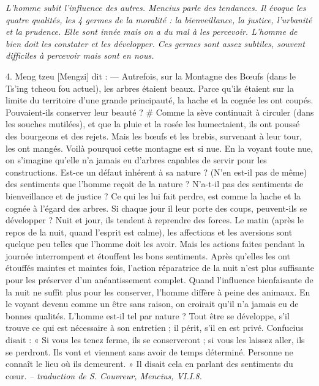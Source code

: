 \textit{L'homme subit l'influence des autres.
Mencius parle des tendances. Il évoque les quatre qualités, les 4 germes de la moralité : la bienveillance, la justice, l'urbanité et la prudence. Elle sont innée mais on a du mal à les percevoir. L'homme de bien doit les constater et les développer. Ces germes sont assez subtiles, souvent difficiles à percevoir mais sont en nous. 
}

\begin{singlequote}
    4.	Meng tzeu [Mengzi] dit :
—	Autrefois, sur la Montagne des Bœufs (dans le Ts’ing tcheou fou actuel), les arbres étaient beaux. Parce qu’ils étaient sur la limite du territoire d’une grande principauté, la hache et la cognée les ont coupés. Pouvaient-ils conserver leur beauté ? # Comme la sève continuait à circuler (dans les souches mutilées), et que la pluie et la rosée les humectaient, ils ont poussé des bourgeons et des rejets. Mais les bœufs et les brebis, survenant à leur tour, les ont mangés. Voilà pourquoi cette montagne est si nue. En la voyant toute nue, on s’imagine qu’elle n’a jamais eu d’arbres capables de servir pour les constructions. Est-ce un défaut inhérent à sa nature ?
(N’en est-il pas de même) des sentiments que l’homme reçoit de la nature ? N’a-t-il pas des sentiments de bienveillance et de justice ? Ce qui les lui fait perdre, est comme la hache et la cognée à l’égard des arbres. Si chaque jour il leur porte des coups, peuvent-ils se développer ? Nuit et jour, ils tendent à reprendre des forces. Le matin (après le repos de la nuit, quand l’esprit est calme), les affections et les aversions sont quelque peu telles que l’homme doit les avoir. Mais les actions faites pendant la journée interrompent et étouffent les bons sentiments. Après qu’elles les ont étouffés maintes et maintes fois, l’action réparatrice de la nuit n’est plus suffisante pour les préserver d’un anéantissement complet. Quand l’influence bienfaisante de la nuit ne suffit plus pour les conserver, l’homme diffère à peine des animaux. En le voyant devenu comme un être sans raison, on croirait qu’il n’a jamais eu de bonnes qualités. L’homme est-il tel par nature ? Tout être se développe, s’il trouve ce qui est nécessaire à son entretien ; il périt, s’il en est privé. Confucius disait : « Si vous les tenez ferme, ils se conserveront ; si vous les laissez aller, ils se perdront. Ils vont et viennent sans avoir de temps déterminé. Personne ne connaît le lieu où ils demeurent. » Il disait cela en parlant des sentiments du cœur. 
 \textit{\small -- traduction de S. Couvreur, Mencius, VI.I.8.}

\end{singlequote}

